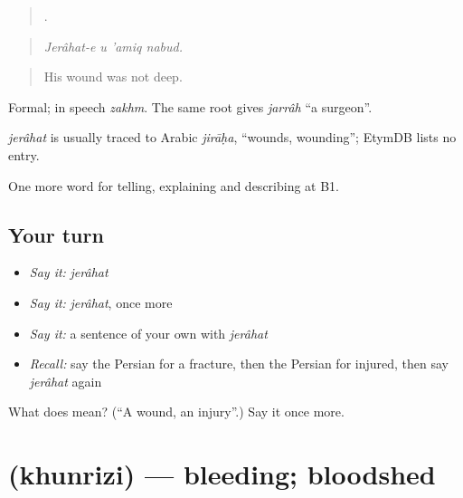\begin{quote}
   .
\end{quote}

\begin{quote}
\emph{Jerâhat-e u 'amiq nabud.}
\end{quote}

\begin{quote}
His wound was not deep.
\end{quote}

Formal; in speech \emph{zakhm}. The same root gives \emph{jarrâh} \textquotedblleft{}a surgeon\textquotedblright{}.

\begin{cousinweb}
\emph{jerâhat} is usually traced to Arabic \emph{jirāḥa}, \textquotedblleft{}wounds, wounding\textquotedblright{}; EtymDB lists no entry.
\end{cousinweb}

\begin{grammarlens}[title={What you've built}]
One more word for telling, explaining and describing at B1.
\end{grammarlens}

\subsection*{Your turn}
\begin{itemize}
\raggedright
  \item \emph{Say it:} \emph{jerâhat}
  \item \emph{Say it:} \emph{jerâhat}, once more
  \item \emph{Say it:} a sentence of your own with \emph{jerâhat}
  \item \emph{Recall:} say the Persian for a fracture, then the Persian for injured, then say \emph{jerâhat} again
\end{itemize}

\begin{tcolorbox}[breakable,colback=teal!4,colframe=teal!35!black,title={Before you move on}]
What does  mean? (\textquotedblleft{}A wound, an injury\textquotedblright{}.) Say it once more.
\end{tcolorbox}
\section[\texorpdfstring{\fa{خونریزی} (khunrizi)}{خونریزی (khunrizi)}]{ (khunrizi) — bleeding; bloodshed}

